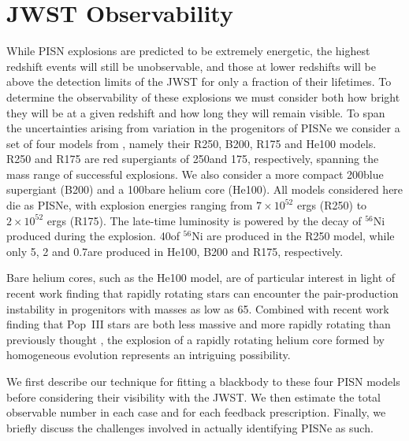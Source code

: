 \documentclass[../thesis.tex]{subfiles}
\begin{document}
\section{JWST Observability}
\label{JWSTobs}
While PISN explosions are predicted to be extremely energetic, the
highest redshift events will still be unobservable, and those at lower
redshifts will be above the detection limits of the JWST for only a
fraction of their lifetimes. To determine the observability of these
explosions we must consider both how bright they will be at a given
redshift and how long they will remain visible.  To span the
uncertainties arising from variation in the progenitors of PISNe we
consider a set of four models from \citet{KasenWoosleyHeger2011},
namely their R250, B200, R175 and He100 models.  R250 and R175 are red
supergiants of 250\msun and 175\msun, respectively, spanning the mass
range of successful explosions.  We also consider a more compact
200\msun blue supergiant (B200) and a 100\msun bare helium core
(He100).  All models considered here die as PISNe, with explosion
energies ranging from $7\times10^{52}$ ergs (R250) to $2\times10^{52}$
ergs (R175).  The late-time luminosity is powered by the decay of
$^{56}$Ni produced during the explosion.  40\msun of $^{56}$Ni are
produced in the R250 model, while only 5, 2 and 0.7\msun are produced
in He100, B200 and R175, respectively.

Bare helium cores, such as the He100 model, are of particular interest
in light of recent work finding that rapidly rotating stars can
encounter the pair-production instability in progenitors with masses
as low as 65\msun \citep{ChatzopoulosWheeler2012,
  YoonDierksLanger2012}. Combined with recent work finding that
Pop~III stars are both less massive and more rapidly rotating than
previously thought \citep{StacyGreifBromm2010, StacyBrommLoeb2011b,
  StacyGreifBromm2012, Clarketal2011b, Greifetal2011, Greifetal2012},
the explosion of a rapidly rotating helium core formed by homogeneous
evolution represents an intriguing possibility.

We first describe our technique for fitting a blackbody to these four
PISN models before considering their visibility with the JWST. We then
estimate the total observable number in each case and for each
feedback prescription.  Finally, we briefly discuss the challenges
involved in actually identifying PISNe as such.
\end{document}
